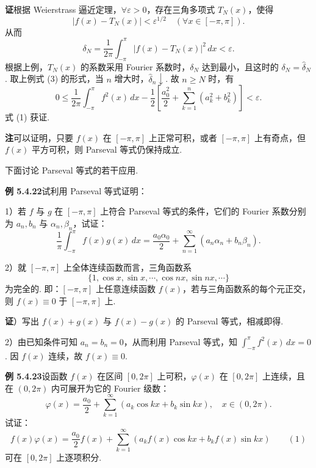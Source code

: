 \documentclass[UTF8, 12pt, fontset=fandol, oneside]{ctexart}
\begin{document}
\noindent\textbf{证}\quad 根据 Weierstrass 逼近定理，$\forall\varepsilon>0$，存在三角多项式
$T_N(x)$，使得
\[
  |f(x)-T_N(x)|<\varepsilon^{1/2}\quad(\forall x\in[-\pi,\pi]).
\]
从而
\[
  \delta_N=\frac1{2\pi}\int_{-\pi}^{\pi}|f(x)-T_N(x)|^2\,dx<\varepsilon.
\]
根据上例，$T_N(x)$ 的系数采用 Fourier 系数时，$\delta_N$ 达到最小，且这时的
$\delta_N=\hat\delta_N$. 取上例式 (3) 的形式，当 $n$ 增大时，$\hat\delta_n\downarrow$. 故 $n\ge N$ 时，有
\[
  0\le\frac1{2\pi}\int_{-\pi}^{\pi}f^2(x)\,dx
  -\frac12\left[\frac{a_0^2}{2}+\sum_{k=1}^{n}(a_k^2+b_k^2)\right]<\varepsilon.
\]
式 (1) 获证.

\noindent\textbf{注}\quad 可以证明，只要 $f(x)$ 在 $[-\pi,\pi]$ 上正常可积，或者 $[-\pi,\pi]$ 上有奇点，但
$f(x)$ 平方可积，则 Parseval 等式仍保持成立.

下面讨论 Parseval 等式的若干应用.

\noindent\textbf{例 5.4.22}\quad 试利用 Parseval 等式证明：

1）若 $f$ 与 $g$ 在 $[-\pi,\pi]$ 上符合 Parseval 等式的条件，它们的 Fourier 系数分别为
$a_n,b_n$ 与 $\alpha_n,\beta_n$，试证：
\[
  \frac1\pi\int_{-\pi}^{\pi}f(x)g(x)\,dx
  =\frac{a_0\alpha_0}{2}+\sum_{n=1}^{\infty}(a_n\alpha_n+b_n\beta_n).
\]

2）就 $[-\pi,\pi]$ 上全体连续函数而言，三角函数系
\[
  \{1,\cos x,\sin x,\cdots,\cos nx,\sin nx,\cdots\}
\]
为完全的. 即：$[-\pi,\pi]$ 上任意连续函数 $f(x)$，若与三角函数系的每个元正交，则
$f(x)\equiv0$ 于 $[-\pi,\pi]$ 上.

\noindent\textbf{证}）写出 $f(x)+g(x)$ 与 $f(x)-g(x)$ 的 Parseval 等式，相减即得.

2）由已知条件可知 $a_n=b_n=0$，从而利用 Parseval 等式，知
$\displaystyle\int_{-\pi}^{\pi}f^2(x)\,dx=0$. 因 $f(x)$ 连续，故 $f(x)\equiv0$.

\noindent\textbf{例 5.4.23}\quad 设函数 $f(x)$ 在区间 $[0,2\pi]$ 上可积，$\varphi(x)$ 在 $[0,2\pi]$ 上连续，且在
$(0,2\pi)$ 内可展开为它的 Fourier 级数：
\[
  \varphi(x)=\frac{a_0}{2}+\sum_{k=1}^{\infty}(a_k\cos kx+b_k\sin kx),\quad x\in(0,2\pi).
\]
试证：
\[
  f(x)\varphi(x)=\frac{a_0}{2}f(x)+
  \sum_{k=1}^{\infty}(a_kf(x)\cos kx+b_kf(x)\sin kx) \qquad(1)
\]
可在 $[0,2\pi]$ 上逐项积分.
\end{document}
